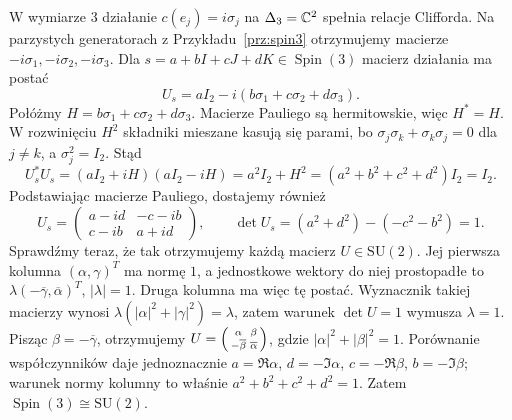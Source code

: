 \begin{przyklad}
\label{prz:bloch}
W wymiarze $3$ działanie
$c(e_j)=i\sigma_j$ na $\Delta_3=\mathbb{C}^2$
spełnia relacje Clifforda. Na parzystych
generatorach z Przykładu~\ref{prz:spin3}
otrzymujemy macierze $-i\sigma_1,-i\sigma_2,
-i\sigma_3$. Dla
$s=a+bI+cJ+dK\in\operatorname{Spin}(3)$
macierz działania ma postać
\[
 U_s=aI_2-i(b\sigma_1+c\sigma_2+d\sigma_3).
\]
Połóżmy $H=b\sigma_1+c\sigma_2+d\sigma_3$.
Macierze Pauliego są hermitowskie, więc $H^*=H$.
W rozwinięciu $H^2$ składniki mieszane kasują się parami,
bo $\sigma_j\sigma_k+\sigma_k\sigma_j=0$ dla $j\ne k$,
a $\sigma_j^2=I_2$. Stąd
\[
 U_s^*U_s=(aI_2+iH)(aI_2-iH)
 =a^2I_2+H^2=(a^2+b^2+c^2+d^2)I_2=I_2.
\]
Podstawiając macierze Pauliego, dostajemy również
\[
 U_s=\begin{pmatrix}a-id&-c-ib\\c-ib&a+id\end{pmatrix},
 \qquad
 \det U_s=(a^2+d^2)-(-c^2-b^2)=1.
\]
Sprawdźmy teraz, że tak otrzymujemy każdą macierz $U\in\mathrm{SU}(2)$.
Jej pierwsza kolumna $(\alpha,\gamma)^T$ ma normę $1$,
a jednostkowe wektory do niej prostopadłe to
$\lambda(-\overline\gamma,\overline\alpha)^T$, $|\lambda|=1$.
Druga kolumna ma więc tę postać. Wyznacznik takiej macierzy
wynosi $\lambda(|\alpha|^2+|\gamma|^2)=\lambda$,
zatem warunek $\det U=1$ wymusza $\lambda=1$.
Pisząc $\beta=-\overline\gamma$, otrzymujemy
$U=\begin{psmallmatrix}\alpha&\beta\\
-\overline\beta&\overline\alpha\end{psmallmatrix}$,
gdzie $|\alpha|^2+|\beta|^2=1$.
Porównanie współczynników daje jednoznacznie
$a=\Re\alpha$, $d=-\Im\alpha$,
$c=-\Re\beta$, $b=-\Im\beta$;
warunek normy kolumny to właśnie $a^2+b^2+c^2+d^2=1$.
Zatem $\operatorname{Spin}(3)\cong\mathrm{SU}(2)$.


\end{przyklad}
